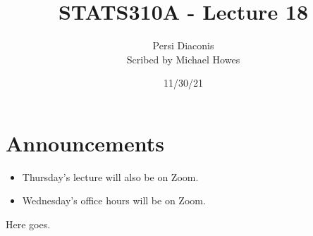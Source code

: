 




\title{STATS310A - Lecture 18}
\author{Persi Diaconis\\ Scribed by Michael Howes}
\date{11/30/21}

\pagestyle{fancy}
\fancyhf{}


\maketitle
\tableofcontents
\section{Announcements}
\begin{itemize}
    \item Thursday's lecture will also be on Zoom.
    \item Wednesday's office hours will be on Zoom.
\end{itemize}
Here goes.
